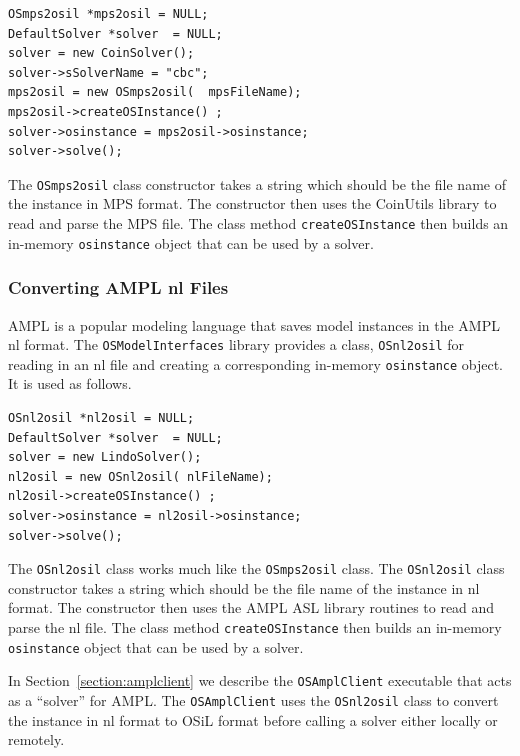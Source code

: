 \documentclass[11pt]{article}
\renewcommand{\_}{{\char"5F}}
\renewcommand{\{}{{\char"7B}}
\renewcommand{\}}{{\char"7D}}
\renewcommand{\^}{{\char"0D}}
\renewcommand{\'}{{\char"0D}}
\begin{document}
\begin{enumerate}[Step 1:]
\begin{verbatim}
OSmps2osil *mps2osil = NULL;
DefaultSolver *solver  = NULL;
solver = new CoinSolver();
solver->sSolverName = "cbc";
mps2osil = new OSmps2osil(  mpsFileName);
mps2osil->createOSInstance() ;
solver->osinstance = mps2osil->osinstance;
solver->solve();
\end{verbatim}

The {\tt OSmps2osil} class constructor takes a string which should be the file name of the instance in MPS format. The constructor then uses the CoinUtils library to read and parse the MPS file.  The class method {\tt createOSInstance} then builds  an in-memory {\tt osinstance} object  that can be used by a solver.

\subsubsection{Converting AMPL nl Files}\label{section:nl2osil}

AMPL is a popular modeling language that saves  model instances in the AMPL nl format.  
The {\tt OSModelInterfaces} library provides a class, {\tt OSnl2osil} for reading 
in an nl file and creating a 
corresponding in-memory  {\tt osinstance} object. It is used as follows.

\begin{verbatim}
OSnl2osil *nl2osil = NULL;
DefaultSolver *solver  = NULL;
solver = new LindoSolver();
nl2osil = new OSnl2osil( nlFileName);
nl2osil->createOSInstance() ;
solver->osinstance = nl2osil->osinstance;
solver->solve();
\end{verbatim}


The {\tt OSnl2osil} class works much like the {\tt OSmps2osil} class. The 
{\tt OSnl2osil} class constructor takes a string which should be the file name of the instance in nl format. The constructor then uses the AMPL ASL library routines to read and parse the nl file. The class method {\tt createOSInstance} then builds  an in-memory {\tt osinstance} object  that can be used by a solver.

In Section~\ref{section:amplclient}  we describe the {\tt OSAmplClient} 
executable that acts as a ``solver'' for AMPL. The {\tt OSAmplClient} uses the {\tt OSnl2osil} class to convert 
the instance in nl format to OSiL format before calling a solver either locally or remotely.



\end{enumerate}
\end{document}
